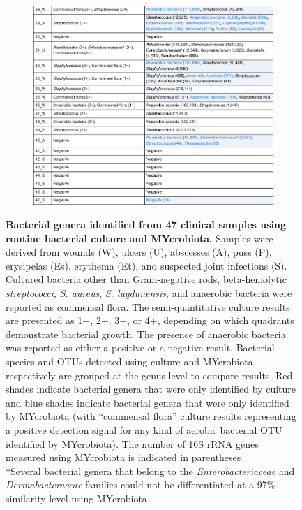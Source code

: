 \begin{figure}\ContinuedFloat
\begin{subfigure}{\textwidth}
 \centering
 \includegraphics[width=\textwidth]{chapters/images/mycrobiota/mycrobiota-table1b.png}
\end{subfigure}
\caption{\textbf{Bacterial genera identified from 47 clinical samples using routine bacterial culture and MYcrobiota.} Samples were derived from wounds (W), ulcers (U), abscesses (A), puss (P), erysipelas (Es), erythema (Et), and suspected joint infections (S). Cultured bacteria other than Gram-negative rods, beta-hemolytic \textit{streptococci}, \textit{S. aureus}, \textit{S. lugdunensis}, and anaerobic bacteria were reported as commensal flora. The semi-quantitative culture results are presented as 1+, 2+, 3+, or 4+, depending on which quadrants demonstrate bacterial growth. The presence of anaerobic bacteria was reported as either a positive or a negative result. Bacterial species and OTUs detected using culture and MYcrobiota respectively are grouped at the genus level to compare results. Red shades indicate bacterial genera that were only identified by culture and blue shades indicate bacterial genera that were only identified by MYcrobiota (with “commensal flora” culture results representing a positive detection signal for any kind of aerobic bacterial OTU identified by MYcrobiota). The number of 16S rRNA genes measured using MYcrobiota is indicated in parentheses \\ *Several bacterial genera that belong to the \textit{Enterobacteriaceae} and \textit{Dermabacteraceae} families could not be differentiated at a 97\% similarity level using MYcrobiota}\label{table:samples}
\end{figure}

